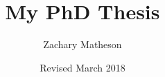 \documentclass[a4paper,12pt]{book}
\begin{document}
\author{Zachary Matheson}
\title{My PhD Thesis}
\date{Revised March 2018}

\frontmatter
\maketitle
\tableofcontents

\mainmatter


\backmatter


\end{document}
